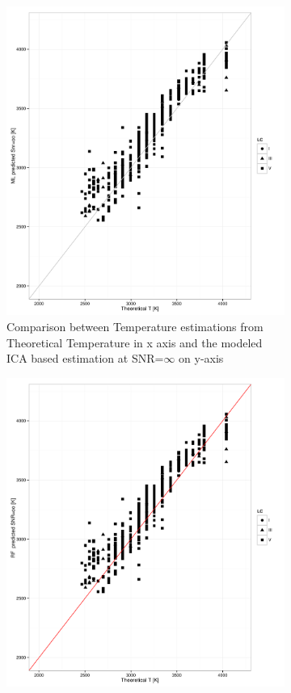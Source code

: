 \begin {figure}
 \centering
 \begin{subfigure}{.85\textwidth}
  \centering
  \includegraphics[width=11cm]{figs/ipac_T_ICAoo_LSB.pdf}
  \caption{Comparison between Temperature estimations from Theoretical Temperature 
  in x axis and the modeled ICA based estimation at SNR=$\infty$ on y-axis}
 \label{fig:ipac_icaoo_lsb}
 \end{subfigure}
  \begin{subfigure}{.85\textwidth}
  \centering
  \includegraphics[width=11cm]{figs/ipac_T_RFoo_LSB.pdf}

\end{subfigure}
\end{figure}

